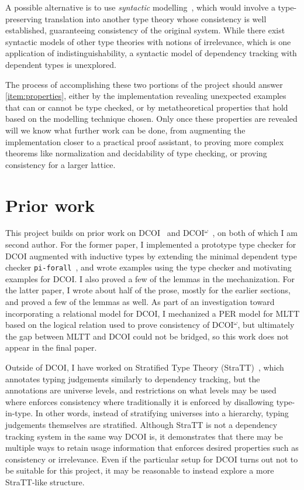 \documentclass{article}
\begin{document}
A possible alternative is to use \emph{syntactic} modelling~\citep{syntactic},
which would involve a type-preserving translation into another type theory
whose consistency is well established,
guaranteeing consistency of the original system.
While there exist syntactic models of other type theories \citep{sprop,ghosts}
with notions of irrelevance, which is one application of indistinguishability,
a syntactic model of dependency tracking with dependent types is unexplored.

The process of accomplishing these two portions of the project
should answer \cref{item:properties},
either by the implementation revealing unexpected examples that can or cannot be type checked,
or by metatheoretical properties that hold based on the modelling technique chosen.
Only once these properties are revealed will we know what further work can be done,
from augmenting the implementation closer to a practical proof assistant,
to proving more complex theorems like normalization and decidability of type checking,
or proving consistency for a larger lattice.

\section{Prior work} \label{sec:prior}

This project builds on prior work on DCOI~\citep{dcoi} and DCOI$^\omega$~\citep{dcoi-omega},
on both of which I am second author.
For the former paper,
I implemented a prototype type checker for DCOI augmented with inductive types
by extending the minimal dependent type checker \texttt{pi-forall}~\citep{pi-forall},
and wrote examples using the type checker and motivating examples for DCOI.
I also proved a few of the lemmas in the mechanization.
For the latter paper,
I wrote about half of the prose, mostly for the earlier sections,
and proved a few of the lemmas as well.
As part of an investigation toward incorporating a relational model for DCOI,
I mechanized a PER model for MLTT based on the logical relation
used to prove consistency of DCOI$^\omega$,
but ultimately the gap between MLTT and DCOI could not be bridged,
so this work does not appear in the final paper.

Outside of DCOI, I have worked on Stratified Type Theory (StraTT)~\citep{stratt},
which annotates typing judgements similarly to dependency tracking,
but the annotations are universe levels,
and restrictions on what levels may be used where enforces consistency
where traditionally it is enforced by disallowing type-in-type.
In other words, instead of stratifying universes into a hierarchy,
typing judgements themselves are stratified.
Although StraTT is not a dependency tracking system in the same way DCOI is,
it demonstrates that there may be multiple ways to retain usage information
that enforces desired properties such as consistency or irrelevance.
Even if the particular setup for DCOI turns out not to be suitable for this project,
it may be reasonable to instead explore a more StraTT-like structure.
\end{document}
